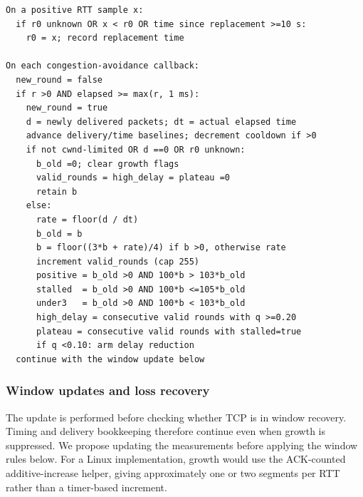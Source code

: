 \documentclass[11pt,letterpaper]{article}
\begin{document}
{\footnotesize\begin{verbatim}
On a positive RTT sample x:
  if r0 unknown OR x < r0 OR time since replacement >=10 s:
    r0 = x; record replacement time

On each congestion-avoidance callback:
  new_round = false
  if r >0 AND elapsed >= max(r, 1 ms):
    new_round = true
    d = newly delivered packets; dt = actual elapsed time
    advance delivery/time baselines; decrement cooldown if >0
    if not cwnd-limited OR d ==0 OR r0 unknown:
      b_old =0; clear growth flags
      valid_rounds = high_delay = plateau =0
      retain b
    else:
      rate = floor(d / dt)
      b_old = b
      b = floor((3*b + rate)/4) if b >0, otherwise rate
      increment valid_rounds (cap 255)
      positive = b_old >0 AND 100*b > 103*b_old
      stalled  = b_old >0 AND 100*b <=105*b_old
      under3   = b_old >0 AND 100*b < 103*b_old
      high_delay = consecutive valid rounds with q >=0.20
      plateau = consecutive valid rounds with stalled=true
      if q <0.10: arm delay reduction
  continue with the window update below
\end{verbatim}}

\clearpage
\subsubsection{Window updates and loss recovery}
The update is performed before checking whether TCP is in window recovery.
Timing and delivery bookkeeping therefore continue even when growth is suppressed.
We propose updating the measurements before applying the window rules below.
For a Linux implementation, growth would use the ACK-counted additive-increase
helper, giving approximately one or two segments per RTT rather than a
timer-based increment.
\end{document}
